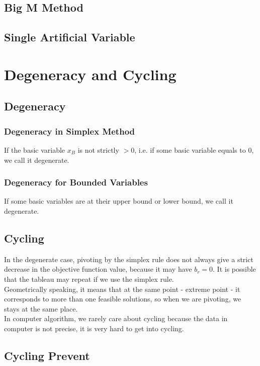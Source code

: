 				\subsection{Big M Method}

				\subsection{Single Artificial Variable}

			\section{Degeneracy and Cycling}
				\subsection{Degeneracy}
					\subsubsection{Degeneracy in Simplex Method}
						If the basic variable $x_B$ is not strictly $> 0$, i.e. if some basic variable equals to 0, we call it degenerate.

					\subsubsection{Degeneracy for Bounded Variables}
						If some basic variables are at their upper bound or lower bound, we call it degenerate.

				\subsection{Cycling}
					In the degenerate case, pivoting by the simplex rule does not always give a strict decrease in the objective function value, because it may have $b_r = 0$. It is possible that the tableau may repeat if we use the simplex rule.\\
					Geometrically speaking, it means that at the same point - extreme point - it corresponds to more than one feasible solutions, so when we are pivoting, we stays at the same place.\\
					In computer algorithm, we rarely care about cycling because the data in computer is not precise, it is very hard to get into cycling.

				\subsection{Cycling Prevent}
